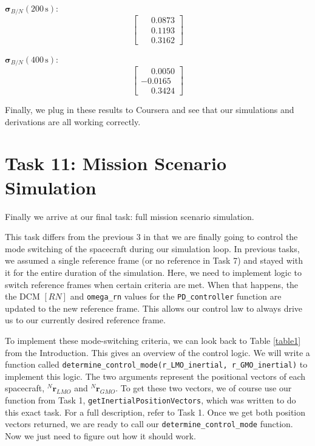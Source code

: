 \documentclass[conf]{new-aiaa}
\begin{document}
$\bm{\sigma}_{B/N}(200\,\text{s})$:
\[
\begin{bmatrix}
\phantom{-}0.0873 \\
\phantom{-}0.1193 \\
\phantom{-}0.3162
\end{bmatrix}
\]

$\bm{\sigma}_{B/N}(400\,\text{s})$:
\[
\begin{bmatrix}
\phantom{-}0.0050 \\
-0.0165 \\
\phantom{-}0.3424
\end{bmatrix}
\]

Finally, we plug in these results to Coursera and see that our simulations and derivations are all working correctly.

\section{Task 11: Mission Scenario Simulation}

Finally we arrive at our final task: full mission scenario simulation. 

This task differs from the previous 3 in that we are finally going to control the mode switching of the spacecraft during our simulation loop. In previous tasks, we assumed a single reference frame (or no reference in Task 7) and stayed with it for the entire duration of the simulation. Here, we need to implement logic to switch reference frames when certain criteria are met. When that happens, the the DCM $[RN]$ and \texttt{omega\_rn} values for the \texttt{PD\_controller} function are updated to the new reference frame. This allows our control law to always drive us to our currently desired reference frame. 

To implement these mode-switching criteria, we can look back to Table \ref{table1} from the Introduction. This gives an overview of the control logic. We will write a function called \texttt{determine\_control\_mode(r\_LMO\_inertial, r\_GMO\_inertial)} to implement this logic. The two arguments represent the positional vectors of each spacecraft, ${}^N\bm r_{LMO}$ and ${}^N\bm r_{GMO}$. To get these two vectors, we of course use our function from Task 1, \texttt{getInertialPositionVectors}, which was written to do this exact task. For a full description, refer to Task 1. Once we get both position vectors returned, we are ready to call our \texttt{determine\_control\_mode} function. Now we just need to figure out how it should work. 
\end{document}
